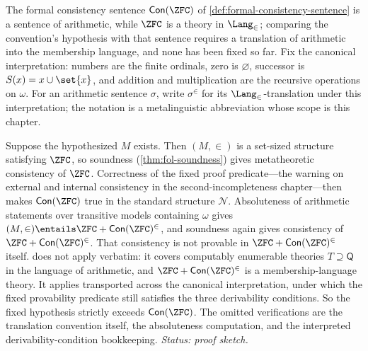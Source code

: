 \begin{remark}
The formal consistency sentence \(\mathsf{Con}(\ZFC)\) of
\cref{def:formal-consistency-sentence} is a sentence of arithmetic, while
\(\ZFC\) is a theory in \(\Lang_{\in}\); comparing the convention's
hypothesis with that sentence requires a translation of arithmetic into the
membership language, and none has been fixed so far.  Fix the canonical
interpretation: numbers are the finite ordinals, zero is \(\varnothing\),
successor is \(S(x)=x\cup\set{x}\), and addition and multiplication are the
recursive operations on \(\omega\).  For an arithmetic sentence \(\sigma\),
write \(\sigma^{\in}\) for its \(\Lang_{\in}\)-translation under this
interpretation; the notation is a metalinguistic abbreviation whose scope is
this chapter.

Suppose the hypothesized \(M\) exists.  Then \((M,\in)\) is a set-sized
structure satisfying \(\ZFC\), so soundness (\cref{thm:fol-soundness})
gives metatheoretic consistency of \(\ZFC\).  Correctness of the fixed
proof predicate---the warning on external and internal consistency in the
second-incompleteness chapter---then makes \(\mathsf{Con}(\ZFC)\) true in
the standard structure \(\mathcal N\).  Absoluteness of arithmetic
statements over transitive models containing \(\omega\)
\cite[Chapter~12, pp.~155--174]{Jech2003} gives
\((M,\in)\entails\ZFC+\mathsf{Con}(\ZFC)^{\in}\), and soundness again gives
consistency of \(\ZFC+\mathsf{Con}(\ZFC)^{\in}\).  That consistency is not
provable in \(\ZFC+\mathsf{Con}(\ZFC)^{\in}\) itself.
 does not apply verbatim: it covers computably
enumerable theories \(T\supseteq\mathsf Q\) in the language of arithmetic,
and \(\ZFC+\mathsf{Con}(\ZFC)^{\in}\) is a membership-language theory.  It
applies transported across the canonical interpretation, under which the
fixed provability predicate still satisfies the three derivability
conditions.  So the fixed hypothesis strictly exceeds
\(\mathsf{Con}(\ZFC)\).  The omitted verifications are the translation
convention itself, the absoluteness computation, and the interpreted
derivability-condition bookkeeping.
\textit{Status: proof sketch.}
\end{remark}

